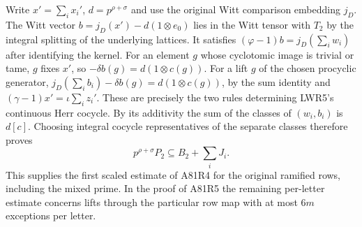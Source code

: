 Write $x'=\sum_i x_i'$, $d=p^{\rho+\sigma}$ and use the original
Witt comparison embedding $j_D$. The Witt vector
$b=j_D(x')-d(1\otimes e_0)$ lies in the Witt tensor with $T_2$
by the integral splitting of the underlying lattices. It satisfies
$(\varphi-1)b=j_D(\sum_i w_i)$ after identifying the kernel.
For an element $g$ whose cyclotomic image is trivial or tame,
$g$ fixes $x'$, so $-\delta b(g)=d(1\otimes c(g))$.
For a lift $g$ of the chosen procyclic generator,
$j_D(\sum_i b_i)-\delta b(g)=d(1\otimes c(g))$, by the
sum identity and $(\gamma-1)x'=\iota\sum_i z_i'$.
These are precisely the two rules determining LWR5's continuous
Herr cocycle. By its additivity the sum of the classes of
$(w_i,b_i)$ is $d[c]$. Choosing integral cocycle representatives
of the separate classes therefore proves
\[
              p^{\rho+\sigma}P_2\subseteq B_2+\sum_iJ_i .
\]
This supplies the first scaled estimate of A81R4 for the original
ramified rows, including the mixed prime. In the proof of A81R5
the remaining per-letter estimate concerns lifts through the
particular row map with at most $6m$ exceptions per letter.
